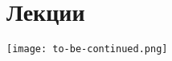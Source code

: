 \documentclass[a4paper,12pt]{book}
\begin{document}
    \pagestyle{empty}
    \titlepage
    \tableofcontents
    
    \chapter{Лекции}
    \pagestyle{fancy}
    
    
    
    
    
    
    
    \begin{flushright}
    	\texttt{[image: to-be-continued.png]}
    \end{flushright}
\end{document}
